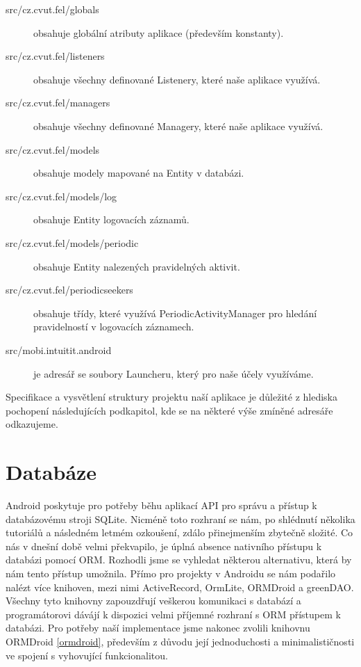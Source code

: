 \documentclass[thesis=M,czech]{FITthesis}[2012/06/26]
\begin{document}
\begin{description}
\item[src/cz.cvut.fel/globals] obsahuje globální atributy aplikace (především konstanty).
\item[src/cz.cvut.fel/listeners] obsahuje všechny definované Listenery, které naše aplikace využívá.
\item[src/cz.cvut.fel/managers] obsahuje všechny definované Managery, které naše aplikace využívá.
\item[src/cz.cvut.fel/models] obsahuje modely mapované na Entity v databázi.
\item[src/cz.cvut.fel/models/log] obsahuje Entity logovacích záznamů.
\item[src/cz.cvut.fel/models/periodic] obsahuje Entity nalezených pravidelných aktivit.
\item[src/cz.cvut.fel/periodicseekers] obsahuje třídy, které využívá PeriodicActivityManager pro hledání pravidelností v logovacích záznamech.
\item[src/mobi.intuitit.android] je adresář se soubory Launcheru, který pro naše účely využíváme.
\end{description}

Specifikace a vysvětlení struktury projektu naší aplikace je důležité z hlediska pochopení následujících podkapitol, kde se na některé výše zmíněné adresáře odkazujeme.

\section{Databáze}
Android poskytuje pro potřeby běhu aplikací API pro správu a přístup k databázovému stroji SQLite. Nicméně toto rozhraní se nám, po shlédnutí několika tutoriálů a následném letmém ozkoušení, zdálo přinejmenším zbytečně složité. Co nás v dnešní době velmi překvapilo, je úplná absence nativního přístupu k databázi pomocí ORM. Rozhodli jsme se vyhledat některou alternativu, která by nám tento přístup umožnila. Přímo pro projekty v Androidu se nám podařilo nalézt více knihoven, mezi nimi ActiveRecord\cite{active_record}, OrmLite\cite{ormlite}, ORMDroid\cite{ormdroid} a greenDAO\cite{greendao}. Všechny tyto knihovny zapouzdřují veškerou komunikaci s databází a programátorovi dávájí k dispozici velmi příjemné rozhraní s ORM přístupem k databázi. Pro potřeby naší implementace jsme nakonec zvolili knihovnu ORMDroid \ref{ormdroid}, především z důvodu její jednoduchosti a minimalističnosti ve spojení s vyhovující funkcionalitou.
\end{document}
